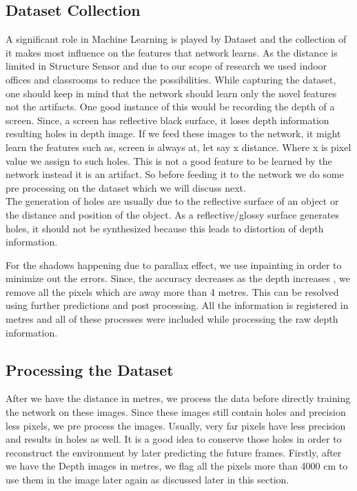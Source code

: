 \subsection{Dataset Collection}

A significant role in Machine Learning is played by Dataset and the collection of it makes most influence on the features that network learns. As the distance is limited in Structure Sensor and due to our scope of research we used indoor offices and classrooms to reduce the possibilities. While capturing the dataset, one should keep in mind that the network should learn only the novel features not the artifacts. One good instance of this would be recording the depth of a screen. Since, a screen has reflective black surface, it loses depth information resulting holes in depth image.  If we feed these images to the network, it might learn the features such as, screen is always at, let say x distance. Where x is pixel value we assign to such holes. This is not a good feature to be learned by the network instead it is an artifact. So before feeding it to the network we do some pre processing on the dataset which we will discuss next.\\

The generation of holes are usually due to the reflective surface of an object or the distance and position of the object\cite{geomar41830}. As a reflective/glossy surface generates holes, it should not be synthesized because this leads to distortion of depth information.

For the shadows happening due to parallax effect, we use inpainting \cite{zamir2018taskonomy} in order to minimize out the errors. Since, the accuracy decreases as the depth increases \cite{deptherror}, we remove all the pixels which are away more than 4 metres. This can be resolved using further predictions and post processing. All the information is registered in metres and  all of these processes were included while processing the raw depth information.\\

\subsection{Processing the Dataset}

After we have the distance in metres, we process the data before directly training the network on these images. Since these images still contain holes and precision less pixels, we pre process the images. Usually, very far pixels have less precision and results in holes as well\cite{deptherror}. It is a good idea to conserve those holes in order to reconstruct the environment by later predicting the future frames. Firstly, after we have the Depth images in metres, we flag  all the pixels more than 4000 cm to use them in the image later again as discussed later in this section.

